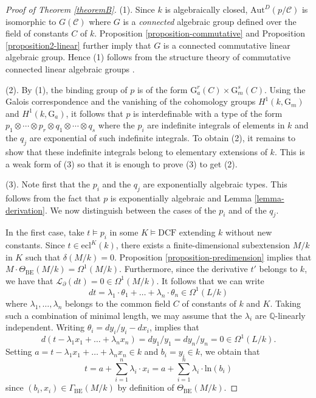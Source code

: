 \documentclass[12pt]{amsart}
\newcommand{\DCF}{\mathrm{DCF}}
\newcommand{\BE}{\mathrm{BE}}
\theoremstyle{definition}
\theoremstyle{plain}
\theoremstyle{exampstyle}\newtheorem{thmx}{Theorem}
\theoremstyle{exampstyle}\newtheorem{thmxbis}{Theorem}
\newcommand{\Gm}{\mathrm{G}_m}
\newcommand{\Ga}{\mathrm{G}_a}
\begin{document}
\begin{proof}[Proof of Theorem \ref{theoremB}]
(1). Since $k$ is algebraically closed, $\mathrm{Aut}^D(p/\mathcal C)$ is isomorphic to $G(\mathcal C)$ where $G$ is a {\em connected} algebraic group defined over the field of constants $C$ of $k$. Proposition \ref{proposition-commutative} and Proposition \ref{proposition2-linear} further imply that $G$ is a connected commutative linear algebraic group. Hence (1) follows from the structure theory of commutative connected linear algebraic groups \cite{Borel}. 

(2). By (1), the binding group of $p$ is of the form $\Ga^r(C) \times \Gm^s(C)$. Using the Galois correspondence and the vanishing of the cohomology groups $H^1(k,\Gm)$ and $H^1(k,\Ga)$, it follows that $p$ is interdefinable with a type of the form
$p_1 \otimes \cdots \otimes p_r \otimes q_1 \otimes \cdots \otimes q_s$ where the $p_i$ are indefinite integrals of elements in $k$ and the $q_j$ are exponential of such indefinite integrals. To obtain (2), it remains to show that these indefinite integrals belong to elementary extensions of $k$. This is a weak form of (3) so that it is enough to prove (3) to get (2). 


(3). Note first that the $p_i$ and the $q_j$ are exponentially algebraic types. This follows from the fact that $p$ is exponentially algebraic and Lemma \ref{lemma-derivation}. We now distinguish between the cases of the $p_i$ and of the $q_j$. 

In the first case, take $t \models p_i$ in some $K \models \DCF$ extending $k$ without new constants. Since $t \in \mathrm{ecl}^{K}(k)$, there exists a finite-dimensional subextension $M/k$ in $K$ such that $\delta(M/k) = 0$. Proposition \ref{proposition-predimension} implies that $M \cdot \Theta_{\BE}(M/k) = \Omega^1(M/k)$. Furthermore, since the derivative $t'$ belongs to $k$, we have that $\mathcal L_\partial(dt) = 0  \in \Omega^1(M/k)$. It follows that we can write 
$$ dt = \lambda_1 \cdot \theta_1 + \ldots + \lambda_n \cdot \theta_n  \in \Omega^1(L/k) $$ 
where $\lambda_1,\ldots, \lambda_n$ belongs to the common field $C$ of constants of $k$ and $K$. Taking such a combination of minimal length, we may assume that the $\lambda_i$ are $\mathbb{Q}$-linearly independent. Writing $\theta_i = dy_i/y_i - dx_i$, \cite[Proposition 4]{Rosenlicht} implies that 
$$d(t - \lambda_1 x_1 + \ldots + \lambda_n x_n) = dy_1/y_1 = dy_n/y_n = 0 \in \Omega^1(L/k).$$
Setting $a = t - \lambda_1 x_1 + \ldots + \lambda_n x_n \in k$ and $b_i = y_i \in k$, we obtain that $$t = a + \sum_{i = 1}^n \lambda_i \cdot x_i = a + \sum_{i = 1}^n \lambda_i \cdot \mathrm{ln}(b_i) $$
since $(b_i,x_i) \in \Gamma_{\BE}(M/k)$ by definition of $\Theta_{\BE}(M/k)$.


\end{proof}
\end{document}

